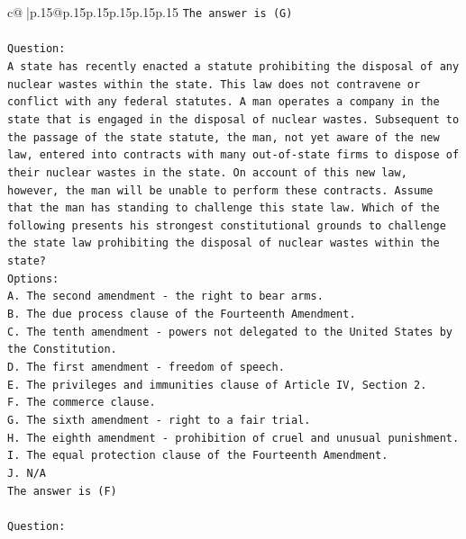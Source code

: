 \documentclass{article}
\begin{document}
{\begin{supertabular}{c@{$\;$}|p{.15\linewidth}@{}p{.15\linewidth}p{.15\linewidth}p{.15\linewidth}p{.15\linewidth}p{.15\linewidth}}
{{{\texttt{The answer is (G)} \\
\\ 
\texttt{Question:} \\
\texttt{A state has recently enacted a statute prohibiting the disposal of any nuclear wastes within the state. This law does not contravene or conflict with any federal statutes. A man operates a company in the state that is engaged in the disposal of nuclear wastes. Subsequent to the passage of the state statute, the man, not yet aware of the new law, entered into contracts with many out{-}of{-}state firms to dispose of their nuclear wastes in the state. On account of this new law, however, the man will be unable to perform these contracts. Assume that the man has standing to challenge this state law. Which of the following presents his strongest constitutional grounds to challenge the state law prohibiting the disposal of nuclear wastes within the state?} \\
\texttt{Options:} \\
\texttt{A. The second amendment {-} the right to bear arms.} \\
\texttt{B. The due process clause of the Fourteenth Amendment.} \\
\texttt{C. The tenth amendment {-} powers not delegated to the United States by the Constitution.} \\
\texttt{D. The first amendment {-} freedom of speech.} \\
\texttt{E. The privileges and immunities clause of Article IV, Section 2.} \\
\texttt{F. The commerce clause.} \\
\texttt{G. The sixth amendment {-} right to a fair trial.} \\
\texttt{H. The eighth amendment {-} prohibition of cruel and unusual punishment.} \\
\texttt{I. The equal protection clause of the Fourteenth Amendment.} \\
\texttt{J. N/A} \\
\texttt{The answer is (F)} \\
\\ 
\texttt{Question:} \\
}}}
\end{supertabular}}
\end{document}
